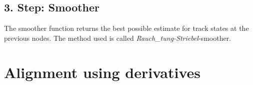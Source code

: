 
\subsection{3. Step: Smoother}
The smoother function returns the best possible estimate for track states at
the previous nodes. The method used is called \textit{Rauch_tung-Striebel}-smoother.


\section{Alignment using derivatives}
\label{sec:derivatives}







%
%
%
%

